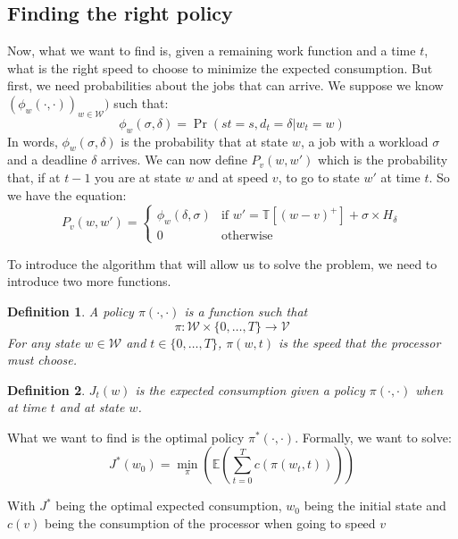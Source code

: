 \documentclass[
10pt, %
a4paper, %
oneside, %
headinclude,footinclude, %
BCOR5mm, %
]{scrartcl}
\newcommand{\V}{\mathcal{V}}
\newcommand{\T}{\mathbb{T}}
\newcommand{\W}{\mathcal{W}}
\newtheorem{defi}{Definition}
\begin{document}
\subsection{Finding the right policy}
Now, what we want to find is, given a remaining work function and a
time $t$, what is the right speed to choose to minimize the expected
consumption. But first, we need probabilities about the jobs that can
arrive. We suppose we know $(\phi_w(\cdot,\cdot))_{w\in\W})$ such that:
\begin{equation}
  \label{eq:prob}
  \phi_w(\sigma, \delta)=\Pr(st=s,d_t=\delta|w_t=w)
\end{equation}
In words, $\phi_w(\sigma,\delta)$ is the probability that at state
$w$, a job with a workload $\sigma$ and a deadline $\delta$
arrives. We can now define $P_v(w,w')$ which is the probability that,
if at $t-1$ you are at state $w$ and at speed $v$, to go to state $w'$
at time $t$. So we have the equation:
\begin{equation}
  \label{eq:wtowp}
  P_v(w,w')=
  \begin{cases}
    \phi_w(\delta,\sigma) & \mbox{if } w'=\T[(w-v)^+]+\sigma\times
    H_\delta\\
    0 & \mbox{otherwise}
  \end{cases}
\end{equation}


To introduce the algorithm that will allow us to solve the problem, we
need to introduce two more functions.

\begin{defi}
  A policy $\pi(\cdot,\cdot)$ is a function such that
  \[
    \pi:\W\times \{0,\dots,T\}\rightarrow\V
  \]
  For any state $w\in\W$ and $t\in\{0,\dots,T\}$, $\pi(w,t)$ is the
  speed that the processor must choose.
\end{defi}

\begin{defi}
  $J_t(w)$ is the expected consumption given a policy
  $\pi(\cdot,\cdot)$ when at time $t$ and at state $w$.
\end{defi}

What we want to find is the optimal policy $\pi^*(\cdot,\cdot)$.
Formally, we want to solve:
\begin{equation}
  \label{eq:rightpolicy}
  J^*(w_0)=\min_\pi \left(\mathbb{E}\left(\sum_{t=0}^Tc(\pi(w_t,t))\right)\right)
\end{equation}

With $J^*$ being the optimal expected consumption, $w_0$ being the
initial state and $c(v)$ being the consumption of the processor when
going to speed $v$\\
\end{document}
